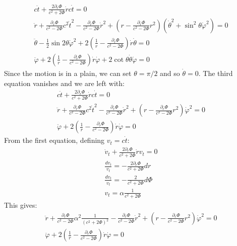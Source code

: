 \documentclass{article}
\begin{document}
\begin{equation}
\begin{gathered}
    c\ddot{t} + \frac{2\partial_r \Phi}{c^2 + 2\Phi}\dot{r}c\dot{t} = 0
    \\
    \ddot{r} + \frac{\partial_r \Phi}{c^2 - 2\Phi} c^2\dot{t}^2 - \frac{\partial_r \Phi}{c^2 - 2\Phi} \dot{r}^2 + \left(r - \frac{\partial_r \Phi}{c^2 - 2\Phi}r^2\right)\left(\dot{\theta}^2 + \sin^2\theta\dot{\varphi}^2\right) = 0
    \\
    \ddot{\theta} - \frac{1}{2}\sin 2\theta \dot{\varphi}^2 + 2\left(\frac{1}{r} - \frac{\partial_r \Phi}{c^2 - 2\Phi}\right)\dot{r}\dot{\theta} = 0
    \\
    \ddot{\varphi} + 2\left(\frac{1}{r} - \frac{\partial_r \Phi}{c^2 - 2\Phi}\right)\dot{r}\dot{\varphi} + 2\cot\theta\dot{\theta}\dot{\varphi} = 0
\end{gathered}
\end{equation}
Since the motion is in a plain, we can set $\theta = \pi/2$ and so $\dot{\theta} = 0$. The third equation vanishes and we are left with:
\begin{equation}
\begin{gathered}
    c\ddot{t} + \frac{2\partial_r \Phi}{c^2 + 2\Phi}\dot{r}c\dot{t} = 0
    \\
    \ddot{r} + \frac{\partial_r \Phi}{c^2 - 2\Phi} c^2\dot{t}^2 - \frac{\partial_r \Phi}{c^2 - 2\Phi} \dot{r}^2 + \left(r - \frac{\partial_r \Phi}{c^2 - 2\Phi}r^2\right)\dot{\varphi}^2 = 0
    \\
    \ddot{\varphi} + 2\left(\frac{1}{r} - \frac{\partial_r \Phi}{c^2 - 2\Phi}\right)\dot{r}\dot{\varphi} = 0
\end{gathered}
\end{equation}
From the first equation, defining $v_t = c\dot{t}$:
\begin{equation}
\begin{gathered}
    \dot{v}_t + \frac{2\partial_r \Phi}{c^2 + 2\Phi}\dot{r}v_t = 0
    \\
    \frac{dv_t}{v_t} = - \frac{2\partial_r \Phi}{c^2 + 2\Phi}dr
    \\
    \frac{dv_t}{v_t} = - \frac{2}{c^2 + 2\Phi}d\Phi
    \\
    v_t = \alpha \frac{1}{c^2 + 2\Phi}
\end{gathered}
\end{equation}
This gives:
\begin{equation}
\begin{gathered}
    \ddot{r} + \frac{\partial_r \Phi}{c^2 - 2\Phi} \alpha^2 \frac{1}{\left(c^2 + 2\Phi\right)^2} - \frac{\partial_r \Phi}{c^2 - 2\Phi} \dot{r}^2 + \left(r - \frac{\partial_r \Phi}{c^2 - 2\Phi}r^2\right)\dot{\varphi}^2 = 0
    \\
    \ddot{\varphi} + 2\left(\frac{1}{r} - \frac{\partial_r \Phi}{c^2 - 2\Phi}\right)\dot{r}\dot{\varphi} = 0
\end{gathered}
\end{equation}
\end{document}
